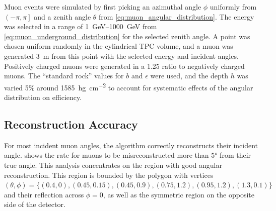 \documentclass[herrin-thesis.tex]{subfiles}
\begin{document}
Muon events were simulated by first picking an azimuthal angle \(\phi\) uniformly from \(\left(-\pi, \pi\right]\) and a zenith angle \(\theta\) from \cref{eq:muon_angular_distribution}. The energy was selected in a range of \SIrange{1}{1000}{\GeV} from \cref{eq:muon_underground_distribution} for the selected zenith angle. A point was chosen uniform randomly in the cylindrical TPC volume, and a muon was generated \SI{3}{\meter} from this point with the selected energy and incident angles. Positively charged muons were generated in a 1.25 ratio to negatively charged muons. The ``standard rock'' values for \(b\) and \(\epsilon\) were used, and the depth \(h\) was varied 5\% around \SI{1585}{\hecto\gram\per\square\centi\meter} to account for systematic effects of the angular distribution on efficiency.

\subsection{Reconstruction Accuracy}
For most incident muon angles, the algorithm correctly reconstructs their incident angle.  shows the rate for muons to be misreconstructed more than \ang{5} from their true angle. This analysis concentrates on the region with good angular reconstruction. This region is bounded by the polygon with vertices \((\theta, \phi) = \{(0.4, 0), (0.45, 0.15), (0.45, 0.9), (0.75, 1.2), (0.95, 1.2), (1.3, 0.1)\}\) and their reflection  across \(\phi=0\), as well as the symmetric region on the opposite side of the detector.
\end{document}

